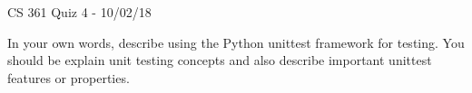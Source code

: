 \documentclass{exam}
\begin{document}
\begin{center}
	CS 361 Quiz 4 - 10/02/18
\end{center}

\vspace{1em}

\begin{center}
\end{center}

\begin{questions}
	
\question[10] In your own words, describe using the Python unittest framework for testing. You should be explain unit testing concepts and also describe important unittest features or properties.

\end{questions}
\end{document}
